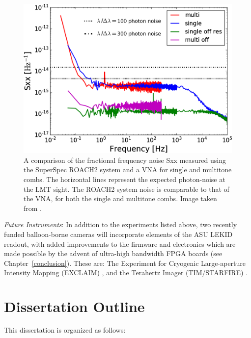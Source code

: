 \begin{figure}[!htbp]
\centering
\includegraphics[width=\textwidth]{figures/intro/superspec_noisecomp}
\caption[Comparison of the fractional frequency noise measured using the SuperSpec ROACH2 system and a VNA for single and multitone combs.]{A comparison of the fractional frequency noise \gls{Sxx} measured using the SuperSpec ROACH2 system and a VNA for single and multitone combs. The horizontal lines represent the expected photon-noise at the LMT sight. The ROACH2 system noise is comparable to that of the VNA, for both the single and multitone combs. Image taken from \citet{mcgeehan2018low}.}
\label{fig:readout noise comp}
\end{figure}

\vspace{5mm}

\textit{Future Instruments}: In addition to the experiments listed above, two recently funded balloon-borne cameras will incorporate elements of the ASU LEKID readout, with added improvements to the firmware and electronics which are made possible by the advent of ultra-high bandwidth FPGA boards (see Chapter~\ref{conclusion}). These are: The Experiment for Cryogenic Large-aperture Intensity Mapping (EXCLAIM) \citep{switzer2017measuring}, and the Terahertz Imager (TIM/STARFIRE) \citep{aguirre2018starfire}.

\section{Dissertation Outline}

This dissertation is organized as follows:

